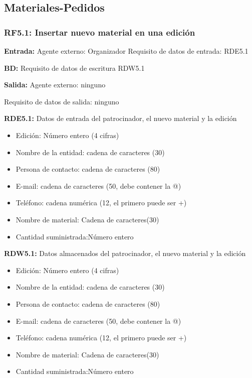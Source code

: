 \subsection{Materiales-Pedidos}
\subsubsection{RF5.1: Insertar nuevo material en una edición}

\textbf{Entrada:} Agente externo: Organizador        Requisito de datos de entrada: RDE5.1

\textbf{BD: }Requisito de datos de escritura RDW5.1

\textbf{Salida:} Agente externo: ninguno

Requisito de datos de salida: ninguno

\textbf{RDE5.1: }Datos de entrada del patrocinador, el nuevo material y la edición
\begin{itemize}
	\item Edición: Número entero (4 cifras)
\newline
	\item Nombre de la entidad: cadena de caracteres (30)
	\item Persona de contacto: cadena de caracteres (80)
	\item E-mail: cadena de caracteres (50, debe contener la @)
	\item Teléfono: cadena numérica (12, el primero puede ser +)
\newline
	\item Nombre de material: Cadena de caracteres(30)
	\item Cantidad suministrada:Número entero
\end{itemize}

\textbf{RDW5.1: }Datos almacenados del patrocinador, el nuevo material y la edición
\begin{itemize}
	\item Edición: Número entero (4 cifras)
\newline
	\item Nombre de la entidad: cadena de caracteres (30)
	\item Persona de contacto: cadena de caracteres (80)
	\item E-mail: cadena de caracteres (50, debe contener la @)
	\item Teléfono: cadena numérica (12, el primero puede ser +)
\newline
	\item Nombre de material: Cadena de caracteres(30)
	\item Cantidad suministrada:Número entero
\end{itemize}

